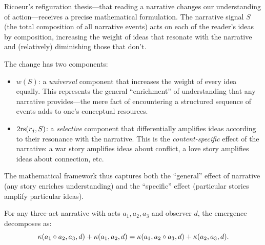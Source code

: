 \begin{interpretation}
\label{interp:refiguration}
Ricoeur's refiguration thesis---that reading a narrative changes our
understanding of action---receives a precise mathematical formulation.  The
narrative signal $S$ (the total composition of all narrative events) acts on
each of the reader's ideas by composition, increasing the weight of ideas
that resonate with the narrative and (relatively) diminishing those that don't.

The change has two components:
\begin{itemize}
\item $w(S)$: a \emph{universal} component that increases the weight of
every idea equally.  This represents the general ``enrichment'' of
understanding that any narrative provides---the mere fact of encountering
a structured sequence of events adds to one's conceptual resources.
\item $2\mathrm{rs}(r_j, S)$: a \emph{selective} component that differentially
amplifies ideas according to their resonance with the narrative.  This is
the \emph{content-specific} effect of the narrative: a war story amplifies
ideas about conflict, a love story amplifies ideas about connection, etc.
\end{itemize}

The mathematical framework thus captures both the ``general'' effect of
narrative (any story enriches understanding) and the ``specific'' effect
(particular stories amplify particular ideas).
\end{interpretation}


\begin{theorem}
\label{thm:three-act-cocycle}
For any three-act narrative with acts $a_1, a_2, a_3$ and observer $d$, the emergence decomposes as:
\[
  \kappa(a_1 \circ a_2, a_3, d) + \kappa(a_1, a_2, d) = \kappa(a_1, a_2 \circ a_3, d) + \kappa(a_2, a_3, d).
\]
\end{theorem}

